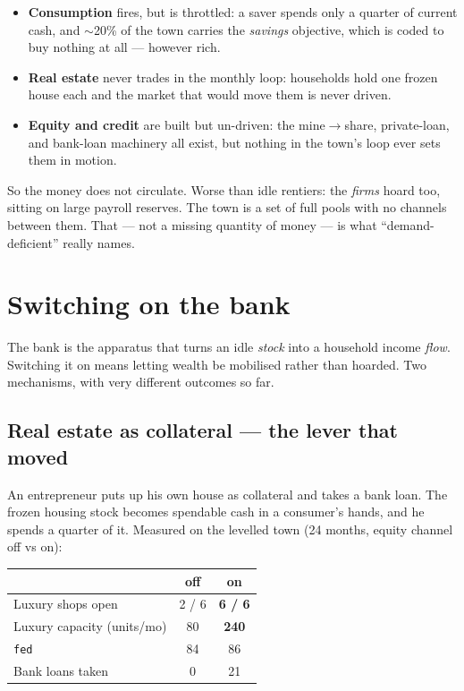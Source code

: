 \documentclass[11pt]{article}
\begin{document}
\begin{itemize}
\item \textbf{Consumption} fires, but is throttled: a saver spends only a quarter
of current cash, and $\sim$20\% of the town carries the \emph{savings} objective,
which is coded to buy nothing at all --- however rich.
\item \textbf{Real estate} never trades in the monthly loop: households hold one
frozen house each and the market that would move them is never driven.
\item \textbf{Equity and credit} are built but un-driven: the mine$\to$share,
private-loan, and bank-loan machinery all exist, but nothing in the town's loop
ever sets them in motion.
\end{itemize}

So the money does not circulate. Worse than idle rentiers: the \emph{firms} hoard
too, sitting on large payroll reserves. The town is a set of full pools with no
channels between them. That --- not a missing quantity of money --- is what
``demand-deficient'' really names.

\section{Switching on the bank}

The bank is the apparatus that turns an idle \emph{stock} into a household
income \emph{flow}. Switching it on means letting wealth be mobilised rather than
hoarded. Two mechanisms, with very different outcomes so far.

\subsection{Real estate as collateral --- the lever that moved}

An entrepreneur puts up his own house as collateral and takes a bank loan. The
frozen housing stock becomes spendable cash in a consumer's hands, and he spends
a quarter of it. Measured on the levelled town (24 months, equity channel off vs
on):

\begin{center}
\begin{tabular}{@{}lcc@{}}
\toprule
 & \textbf{off} & \textbf{on} \\
\midrule
Luxury shops open & 2 / 6 & \textbf{6 / 6} \\
Luxury capacity (units/mo) & 80 & \textbf{240} \\
\texttt{fed} & 84 & 86 \\
Bank loans taken & 0 & 21 \\
\bottomrule
\end{tabular}
\end{center}
\end{document}
